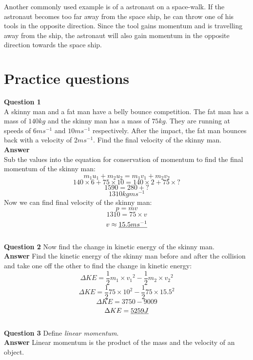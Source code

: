 \documentclass{article}
\begin{document}
Another commonly used example is of a astronaut on a space-walk. If the astronaut becomes too far away from the space ship, he can throw one of his tools in the opposite direction. Since the tool gains momentum and is travelling away from the ship, the astronaut will also gain momentum in the opposite direction towards the space ship.


\section*{Practice questions}
\label{sec:PracticeQuestions}
\textbf{Question 1}\\
A skinny man and a fat man have a belly bounce competition. The fat man has a mass of $140kg$ and the skinny man has a mass of $75kg$. They are running at speeds of $6ms^{-1}$ and $10ms^{-1}$ respectively. After the impact, the fat man bounces back with a velocity of $2ms^{-1}$. Find the final velocity of the skinny man.
\\[3ex]
\noindent
\textbf{Answer} \\
Sub the values into the equation for conservation of momentum to find the final momentum of the skinny man:
\[
	m_1 u_1 + m_2 u_2 = m_1 v_1 + m_2 v_2
\]
\[
	140 \times 6 + 75 \times 10 = 140 \times 2 + 75 \times ?
\]
\[
	1590 = 280 + ?
\]
\[
	1310 kgms^{-1}
\]
Now we can find final velocity of the skinny man:
\[
	p = mv
\]
\[
	1310 = 75 \times v
\]
\[
	v \approx \uline{15.5ms^{-1}}
\]
\\[3ex]
\noindent
\textbf{Question 2}
Now find the change in kinetic energy of the skinny man.
\\[3ex]
\noindent
\textbf{Answer}
Find the kinetic energy of the skinny man before and after the collision and take one off the other to find the change in kinetic energy:
\[
	\Delta KE = \frac{1}{2}m_1 \times {v_1}^2 - \frac{1}{2}m_2 \times {v_2}^2
\]
\[
	\Delta KE = \frac{1}{2}75 \times 10^2 - \frac{1}{2}75 \times 15.5^2
\]
\[
	\Delta KE = 3750 - 9009
\]
\[
	\Delta KE = \uline{5259J}
\]
\\[3ex]
\noindent
\textbf{Question 3}
Define \textit{linear momentum}.
\\[3ex]
\noindent
\textbf{Answer}
Linear momentum is the product of the mass and the velocity of an object.
\end{document}
